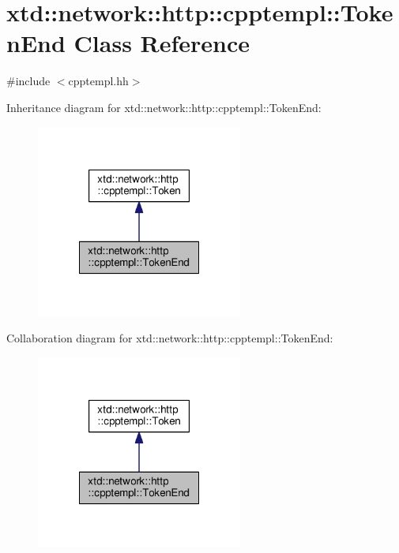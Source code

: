 \hypertarget{classxtd_1_1network_1_1http_1_1cpptempl_1_1TokenEnd}{\section{xtd\-:\-:network\-:\-:http\-:\-:cpptempl\-:\-:Token\-End Class Reference}
\label{classxtd_1_1network_1_1http_1_1cpptempl_1_1TokenEnd}
}


{\ttfamily \#include $<$cpptempl.\-hh$>$}



Inheritance diagram for xtd\-:\-:network\-:\-:http\-:\-:cpptempl\-:\-:Token\-End\-:
\nopagebreak
\begin{figure}[H]
\begin{center}
\leavevmode
\includegraphics[width=192pt]{classxtd_1_1network_1_1http_1_1cpptempl_1_1TokenEnd__inherit__graph}
\end{center}
\end{figure}


Collaboration diagram for xtd\-:\-:network\-:\-:http\-:\-:cpptempl\-:\-:Token\-End\-:
\nopagebreak
\begin{figure}[H]
\begin{center}
\leavevmode
\includegraphics[width=192pt]{classxtd_1_1network_1_1http_1_1cpptempl_1_1TokenEnd__coll__graph}
\end{center}
\end{figure}
